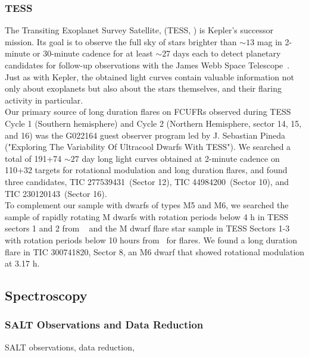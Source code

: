 \documentclass[fleqn,usenatbib,letters]{mnras}%
\newcommand{\FA}{TIC 277539431} %
\newcommand{\FB}{TIC 44984200} %
\newcommand{\FF}{TIC 300741820} %
\newcommand{\FG}{TIC 230120143} %
\begin{document}
\subsubsection{TESS}
\label{sec:photometryTESS}
The Transiting Exoplanet Survey
Satellite, (TESS, \citealt{ricker2015}) is Kepler's successor mission. Its goal is to observe the full sky of stars brighter than $\sim13$ mag in 2-minute or 30-minute cadence for at least $\sim$27 days each to detect planetary candidates for follow-up observations with the James Webb Space Telescope~\citep{gardner2006}. Just as with Kepler, the obtained light curves contain valuable information not only about exoplanets but also about the stars themselves, and their flaring activity in particular.
\\
Our primary source of long duration flares on FCUFRs observed during TESS Cycle 1 (Southern hemisphere) and Cycle 2 (Northern Hemisphere, sector 14, 15, and 16) was the G022164 guest observer program led by J. Sebastian Pineda ("Exploring The Variability Of Ultracool Dwarfs With TESS"). We searched a total of 191+74 $\sim 27$ day long light curves obtained at 2-minute cadence on 110+32 targets for rotational modulation and long duration flares, and found three candidates, \FA~(Sector 12), \FB~(Sector 10), and \FG~(Sector 16).
\\
To complement our sample with dwarfs of types M5 and M6, we searched the sample of rapidly rotating M dwarfs with rotation periods below 4 h in TESS sectors 1 and 2 from ~\citet{zhan2019} and the M dwarf flare star sample in TESS Sectors 1-3 with rotation periods below 10 hours from~\citet{doyle2019} for flares. We found a long duration flare in \FF, Sector 8, an M6 dwarf that showed rotational modulation at 3.17 h.
\subsection{Spectroscopy}
\label{sec:salt}
\subsubsection{SALT Observations and Data Reduction}
SALT observations, data reduction, 
\end{document}
